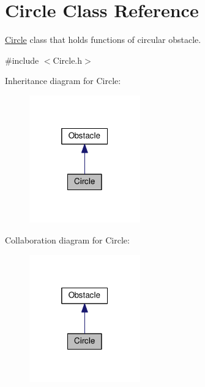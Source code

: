 \hypertarget{classCircle}{}\section{Circle Class Reference}
\label{classCircle}


\hyperlink{classCircle}{Circle} class that holds functions of circular obstacle.  




{\ttfamily \#include $<$Circle.\+h$>$}



Inheritance diagram for Circle\+:\nopagebreak
\begin{figure}[H]
\begin{center}
\leavevmode
\includegraphics[width=136pt]{classCircle__inherit__graph}
\end{center}
\end{figure}


Collaboration diagram for Circle\+:\nopagebreak
\begin{figure}[H]
\begin{center}
\leavevmode
\includegraphics[width=136pt]{classCircle__coll__graph}
\end{center}
\end{figure}
